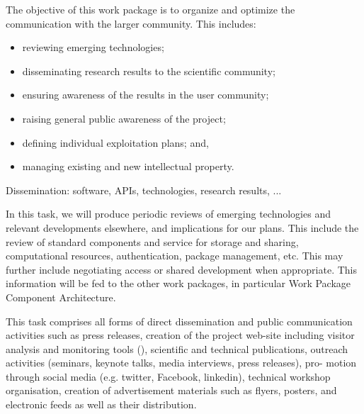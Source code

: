 \begin{workpackage}[id=dissem,wphases=18-48!.5,
  title=Dissemination,
  SARM=1,
  USORM=10,
  USHRM=8,
  USRM=24
]


\begin{wpobjectives}
  The objective of this work package is to organize and optimize the
  communication with the larger community. This includes:
  \begin{itemize}
  \item reviewing emerging technologies;
  \item disseminating research results to the scientific community;
  \item ensuring awareness of the results in the user community;
  \item raising general public awareness of the \TheProject project;
  \item defining individual exploitation plans; and,
  \item managing existing and new intellectual property.
  \end{itemize}
\end{wpobjectives}

\begin{wpdescription}
  Dissemination: software, APIs, technologies, research results, ...
\end{wpdescription}

\begin{tasklist}
\begin{task}[title=Reviewing emerging technologies]
  In this task, we will produce periodic reviews of emerging
  technologies and relevant developments elsewhere, and implications
  for our plans. This include the review of standard components and
  service for storage and sharing, computational resources,
  authentication, package management, etc. This may further include
  negotiating access or shared development when appropriate. This
  information will be fed to the other work packages, in particular
  Work Package~ Component Architecture.
\end{task}

\begin{task}[title=Dissemination and Communication activities]


  This task comprises all forms of direct dissemination and public
  communication activities such as press releases, creation of the
  project web-site including visitor analysis and monitoring tools
  (), scientific and technical publications, outreach
  activities (seminars, keynote talks, media interviews, press
  releases), pro- motion through social media (e.g. twitter, Facebook,
  linkedin), technical workshop organisation, creation of
  advertisement materials such as flyers, posters, and electronic
  feeds as well as their distribution.


\end{task}
\end{tasklist}
\end{workpackage}
